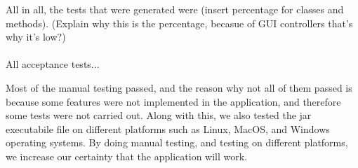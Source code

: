 All in all, the tests that were generated were (insert percentage for classes and methods). (Explain why this is the percentage, becasue of GUI controllers that's why it's low?) \\ \\

All acceptance tests...


Most of the manual testing passed, and the reason why not all of them passed is because some features were not implemented in the application, and therefore some tests were not carried out. Along with this, we also tested the jar executabile file on different platforms such as Linux, MacOS, and Windows operating systems. By doing manual testing, and testing on different platforms, we increase our certainty that the application will work.


